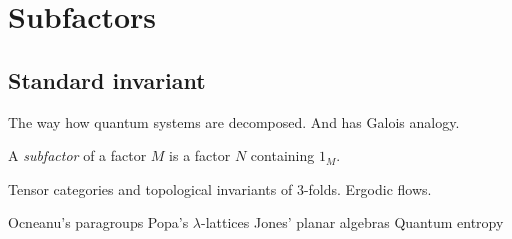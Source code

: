 \documentclass{../../large}
\begin{document}
\part{Subfactors}


\chapter{Standard invariant}

The way how quantum systems are decomposed.
And has Galois analogy.

\begin{prb}
A \emph{subfactor} of a factor $M$ is a factor $N$ containing $1_M$.
\end{prb}

Tensor categories and topological invariants of 3-folds.
Ergodic flows.


Ocneanu's paragroups
Popa's $\lambda$-lattices
Jones' planar algebras
Quantum entropy
\end{document}
